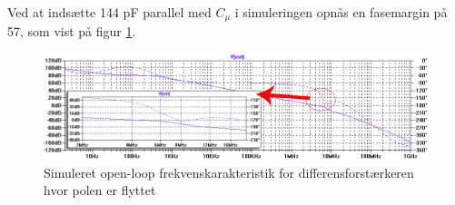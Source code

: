 Ved at indsætte 144 pF parallel med $C_\mu$ i simuleringen opnås en fasemargin på 57\degree, som vist på figur \ref{openloop_efter_korrektion}.

\begin{figure}[h]
\centering
\includegraphics[width=\textwidth]{teknisk/effektforstaerker/stabilitet-medc-graf.png}
\caption{Simuleret open-loop frekvenskarakteristik for differensforstærkeren hvor polen er flyttet}
\label{openloop_efter_korrektion}
\end{figure}